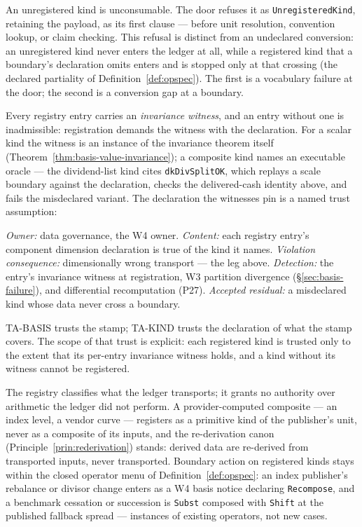 An unregistered kind is unconsumable. The door refuses it as
\texttt{UnregisteredKind}, retaining the payload, as its first clause --- before
unit resolution, convention lookup, or claim checking. This refusal is distinct from
an undeclared conversion: an unregistered kind never enters the ledger at all, while
a registered kind that a boundary's declaration omits enters and is stopped only at
that crossing (the declared partiality of Definition~\ref{def:opspec}). The first is
a vocabulary failure at the door; the second is a conversion gap at a boundary.

Every registry entry carries an \emph{invariance witness}, and an entry without one
is inadmissible: registration demands the witness with the declaration. For a scalar
kind the witness is an instance of the invariance theorem itself
(Theorem~\ref{thm:basis-value-invariance}); a composite kind names an executable
oracle --- the dividend-list kind cites \texttt{dkDivSplitOK}, which replays a scale
boundary against the declaration, checks the delivered-cash identity above, and
fails the misdeclared variant. The declaration the witnesses pin is a named trust
assumption:

\begin{description}[style=nextline]
\item[TA-KIND.] \emph{Owner:} data governance, the W4 owner. \emph{Content:} each
registry entry's component dimension declaration is true of the kind it names.
\emph{Violation consequence:} dimensionally wrong transport --- the  leg
above. \emph{Detection:} the entry's invariance witness at registration, W3
partition divergence (\S\ref{sec:basis-failure}), and differential recomputation
(P27). \emph{Accepted residual:} a misdeclared kind whose data never cross a
boundary.
\end{description}

\noindent
TA-BASIS trusts the stamp; TA-KIND trusts the declaration of what the stamp covers.
The scope of that trust is explicit: each registered kind is trusted only to
the extent that its per-entry invariance witness holds, and a kind without
its witness cannot be registered.

The registry classifies what the ledger transports; it grants no authority over
arithmetic the ledger did not perform. A provider-computed composite --- an index
level, a vendor curve --- registers as a primitive kind of the publisher's unit,
never as a composite of its inputs, and the re-derivation canon
(Principle~\ref{prin:rederivation}) stands: derived data are re-derived from
transported inputs, never transported. Boundary action on registered kinds stays
within the closed operator menu of Definition~\ref{def:opspec}: an index publisher's
rebalance or divisor change enters as a W4 basis notice declaring
\texttt{Recompose}, and a benchmark cessation or succession is \texttt{Subst}
composed with \texttt{Shift} at the published fallback spread --- instances of
existing operators, not new cases.


